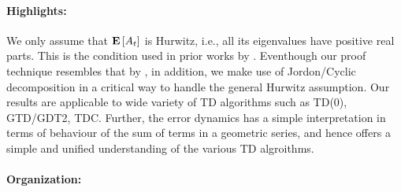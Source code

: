 \paragraph{Highlights:}
 We only assume that $\mathbf{E}\left[A_t\right]$ is Hurwitz, i.e., all its eigenvalues have positive real parts. This is the condition used in prior works by \cite{polyak-judisky,borkarbook}. Eventhough our proof technique resembles that by \cite{bach}, in addition, we make use of Jordon/Cyclic decomposition in a critical way to handle the general Hurwitz assumption. Our results are applicable to wide variety of TD algorithms such as TD(0), GTD/GDT2, TDC. Further, the error dynamics has a simple interpretation in terms of behaviour of the sum of terms in a geometric series, and hence offers a simple and unified understanding of the various TD algroithms.
\paragraph{Organization:}
